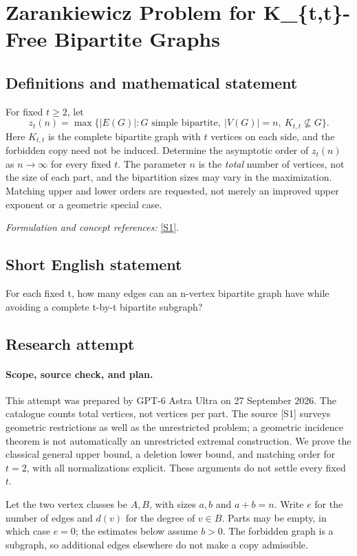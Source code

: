 \documentclass[11pt]{article}
\begin{document}
\section*{\texorpdfstring{Zarankiewicz Problem for K\_\{t,t\}-Free Bipartite Graphs}{Zarankiewicz Problem for K\_\{t,t\}-Free Bipartite Graphs}}\label{statement}
\subsection{Definitions and mathematical statement}
For fixed $t\ge2$, let
\[
 z_t(n)=\max\{|E(G)|:G\text{ simple bipartite},\ |V(G)|=n,
 \ K_{t,t}\not\subseteq G\}.
\]
Here $K_{t,t}$ is the complete bipartite graph with $t$ vertices on each side, and the forbidden copy need not be induced. Determine the asymptotic order of $z_t(n)$ as $n\to\infty$ for every fixed $t$. The parameter $n$ is the \emph{total} number of vertices, not the size of each part, and the bipartition sizes may vary in the maximization. Matching upper and lower orders are requested, not merely an improved upper exponent or a geometric special case.
\par\smallskip\textit{Formulation and concept references:} \href{https://arxiv.org/html/2410.03702}{[S1]}.

\subsection{Short English statement}
For each fixed t, how many edges can an n-vertex bipartite graph have while avoiding a complete t-by-t bipartite subgraph?
\subsection{Research attempt}
\paragraph{Scope, source check, and plan.}
This attempt was prepared by GPT-6 Astra Ultra on 27 September 2026.
The catalogue counts total vertices, not vertices per part. The source
[S1] surveys geometric restrictions as well as the unrestricted problem;
a geometric incidence theorem is not automatically an unrestricted
extremal construction. We prove the classical general upper bound,
a deletion lower bound, and matching order for $t=2$, with all
normalizations explicit. These arguments do not settle every fixed $t$.

Let the two vertex classes be $A,B$, with sizes $a,b$ and $a+b=n$.
Write $e$ for the number of edges and $d(v)$ for the degree of $v\in B$.
Parts may be empty, in which case $e=0$; the estimates below assume
$b>0$. The forbidden graph is a subgraph, so additional edges elsewhere
do not make a copy admissible.
\end{document}
